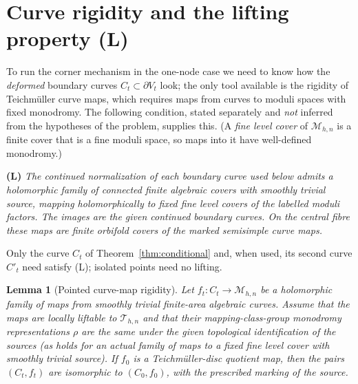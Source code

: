 \documentclass[11pt]{article}
\newcommand{\M}{\mathcal M}
\newcommand{\T}{\mathcal T}
\newtheorem{lemma}[theorem]{Lemma}
\theoremstyle{remark}
\begin{document}
\section{Curve rigidity and the lifting property (L)}\label{sec:lifting}

To run the corner mechanism in the one-node case we need to know
how the \emph{deformed} boundary curves \(C_t\subset\partial V_t\)
look; the only tool available is the rigidity of Teichm\"uller
curve maps, which requires maps from curves to moduli spaces with
fixed monodromy. The following condition, stated separately and
\emph{not} inferred from the hypotheses of the problem, supplies
this. (A \emph{fine level cover} of \(\M_{h,n}\) is a finite cover
that is a fine moduli space, so maps into it have well-defined
monodromy.)

\noindent\textbf{(L)} \emph{The continued normalization of each
boundary curve used below admits a holomorphic family of connected
finite algebraic covers with smoothly trivial source, mapping
holomorphically to fixed fine level covers of the labelled moduli
factors. The images are the given continued boundary curves. On the
central fibre these maps are finite orbifold covers of the marked
semisimple curve maps.}

\noindent Only the curve \(C_t\) of Theorem~\ref{thm:conditional}
and, when used, its second curve \(C'_t\) need satisfy (L); isolated
points need no lifting.

\begin{lemma}[Pointed curve-map rigidity]\label{lem:pointed}
Let \(f_t:C_t\to\M_{h,n}\) be a holomorphic family of maps from
smoothly trivial finite-area algebraic curves. Assume that the maps
are locally liftable to \(\T_{h,n}\) and that their
mapping-class-group monodromy representations \(\rho\) are the same
under the given topological identification of the sources (as holds
for an actual family of maps to a fixed fine level
cover with smoothly trivial source). If \(f_0\) is a
Teichm\"uller-disc quotient map, then the pairs \((C_t,f_t)\) are
isomorphic to \((C_0,f_0)\), with the prescribed marking of the source.
\end{lemma}
\end{document}
